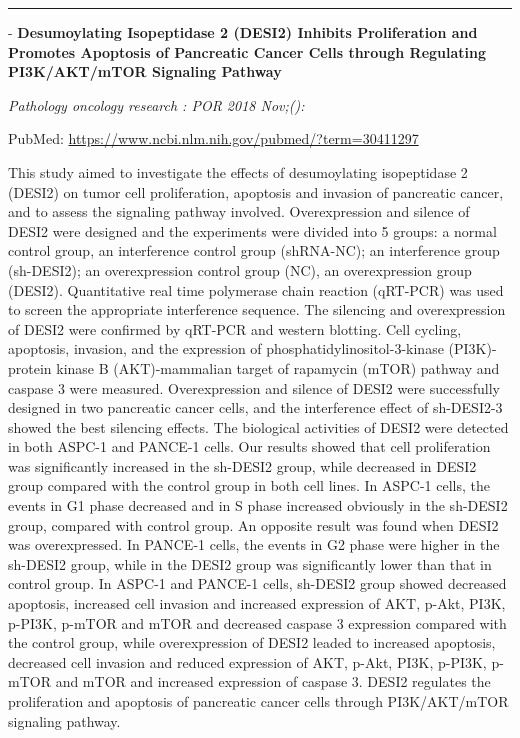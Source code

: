 \documentclass[]{article}
\begin{document}
{}

{}

\begin{center}\rule{0.5\linewidth}{\linethickness}\end{center}

 - \textbf{Desumoylating Isopeptidase 2 (DESI2) Inhibits Proliferation
and Promotes Apoptosis of Pancreatic Cancer Cells through Regulating
PI3K/AKT/mTOR Signaling Pathway}

\emph{Pathology oncology research : POR 2018 Nov;():}

PubMed: \url{https://www.ncbi.nlm.nih.gov/pubmed/?term=30411297}

This study aimed to investigate the effects of desumoylating
isopeptidase 2 (DESI2) on tumor cell proliferation, apoptosis and
invasion of pancreatic cancer, and to assess the signaling pathway
involved. Overexpression and silence of DESI2 were designed and the
experiments were divided into 5 groups: a normal control group, an
interference control group (shRNA-NC); an interference group (sh-DESI2);
an overexpression control group (NC), an overexpression group (DESI2).
Quantitative real time polymerase chain reaction (qRT-PCR) was used to
screen the appropriate interference sequence. The silencing and
overexpression of DESI2 were confirmed by qRT-PCR and western blotting.
Cell cycling, apoptosis, invasion, and the expression of
phosphatidylinositol-3-kinase (PI3K)-protein kinase B (AKT)-mammalian
target of rapamycin (mTOR) pathway and caspase 3 were measured.
Overexpression and silence of DESI2 were successfully designed in two
pancreatic cancer cells, and the interference effect of sh-DESI2-3
showed the best silencing effects. The biological activities of DESI2
were detected in both ASPC-1 and PANCE-1 cells. Our results showed that
cell proliferation was significantly increased in the sh-DESI2 group,
while decreased in DESI2 group compared with the control group in both
cell lines. In ASPC-1 cells, the events in G1 phase decreased and in S
phase increased obviously in the sh-DESI2 group, compared with control
group. An opposite result was found when DESI2 was overexpressed. In
PANCE-1 cells, the events in G2 phase were higher in the sh-DESI2 group,
while in the DESI2 group was significantly lower than that in control
group. In ASPC-1 and PANCE-1 cells, sh-DESI2 group showed decreased
apoptosis, increased cell invasion and increased expression of AKT,
p-Akt, PI3K, p-PI3K, p-mTOR and mTOR and decreased caspase 3 expression
compared with the control group, while overexpression of DESI2 leaded to
increased apoptosis, decreased cell invasion and reduced expression of
AKT, p-Akt, PI3K, p-PI3K, p-mTOR and mTOR and increased expression of
caspase 3. DESI2 regulates the proliferation and apoptosis of pancreatic
cancer cells through PI3K/AKT/mTOR signaling pathway.
\end{document}
